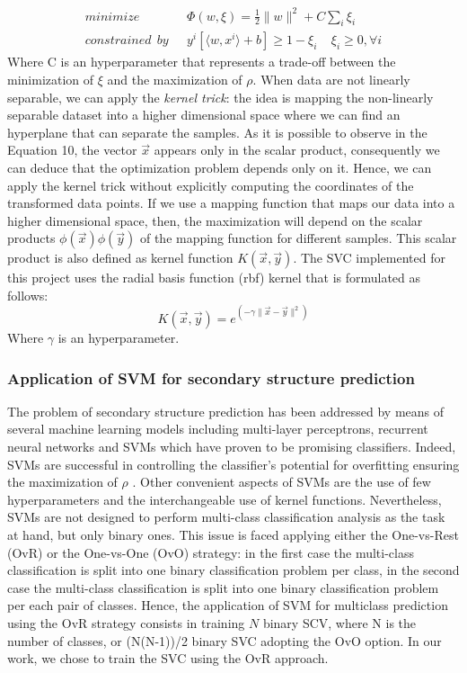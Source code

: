 \documentclass[nocrop]{bioinfo}
\begin{document}
\begin{methods}
\begin{equation}
\begin{split}
    minimize\ \ \ &\Phi(w,\xi)=\frac{1}{2}\|w\|^2 + C \sum_i \xi_i \\
    constrained\ \ by\ \ \ & y^i[\langle w, x^i \rangle  + b] \geq 1 - \xi_i \ \ \ \ \  \xi_i \geq 0, \forall i
\end{split}
\end{equation}
Where C is an hyperparameter that represents a trade-off between the minimization of $\xi$ and the maximization of $\rho$. 
When data are not linearly separable, we can apply the \textit{kernel trick}:  the idea is mapping the non-linearly separable dataset into a higher dimensional space where we can find an hyperplane that can separate the samples. As it is possible to observe in the Equation 10, the vector $\vec{x}$ appears only in the scalar product, consequently we can deduce that the optimization problem depends only on it. Hence, we can apply the kernel trick without explicitly computing the coordinates of the transformed data points. If we use a mapping function that maps our data into a higher dimensional space, then, the maximization will depend on the scalar products $\phi(\vec{x})\phi(\vec{y})$ of the mapping function for different samples. This scalar product is also defined as kernel function $K(\vec{x}, \vec{y})$.
The SVC implemented for this project uses the radial basis function (rbf) kernel that is formulated as follows:
\begin{equation}
		K(\vec{x},\vec{y}) = e^{(-\gamma\|\vec{x}-\vec{y}\|^2)}
\end{equation}
Where $\gamma$ is an hyperparameter.  
\subsubsection{Application of SVM for secondary structure prediction}
The problem of secondary structure prediction has been addressed by means of several machine learning models including multi-layer perceptrons, recurrent neural networks and SVMs which have proven to be promising classifiers. Indeed, SVMs are successful in controlling the classifier's potential for overfitting ensuring the maximization of $\rho$ \citep{ward2003secondary}. Other convenient aspects of SVMs are the use of few hyperparameters and the interchangeable use of kernel functions. Nevertheless, SVMs are not designed to perform multi-class classification analysis as the task at hand, but only binary ones. This issue is faced applying either the One-vs-Rest (OvR) or the One-vs-One (OvO) strategy: in the first case the multi-class classification is split into one binary classification problem per class, in the second case the multi-class classification is split into one binary classification problem per each pair of classes. Hence, the application of SVM for multiclass prediction using the OvR strategy consists in training $N$ binary SCV, where N is the number of classes,  or (N(N-1))/2 binary SVC adopting the OvO option. In our work, we chose to train the SVC using the OvR approach.


\end{methods}
\end{document}
